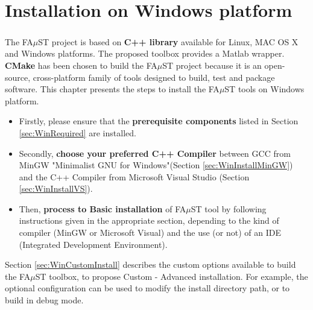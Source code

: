\chapter{Installation on Windows platform}\label{sec:WinInstall}


\paragraph{}The FA$\mu$ST project is based on \textbf{C++ library} available for Linux, MAC OS X and Windows platforms. The proposed toolbox provides a Matlab wrapper. \textbf{CMake} has been chosen to build the FA$\mu$ST project because it is an open-source, cross-platform family of tools designed to build, test and package software. This chapter presents the steps to install the FA$\mu$ST tools on Windows platform.

\begin{itemize}
\item Firstly, please ensure that the \textbf{prerequisite components} listed in Section \ref{sec:WinRequired} are installed. 

\item Secondly, \textbf{choose your preferred C++ Compiler} between GCC from MinGW "Minimalist GNU for Windows"(Section \ref{sec:WinInstallMinGW}) and the C++ Compiler from Microsoft Visual Studio (Section \ref{sec:WinInstallVS}). 

\item Then, \textbf{process to Basic installation} of FA$\mu$ST tool by following instructions given in the appropriate section, depending to the kind of compiler (MinGW or Microsoft Visual) and the use (or not) of an IDE (Integrated Development Environment). 
\end{itemize}







Section \ref{sec:WinCustomInstall} describes the custom options available to build the FA$\mu$ST toolbox, to propose Custom - Advanced installation. For example, the optional configuration can be used to modify the install directory path, or to build in debug mode.  


